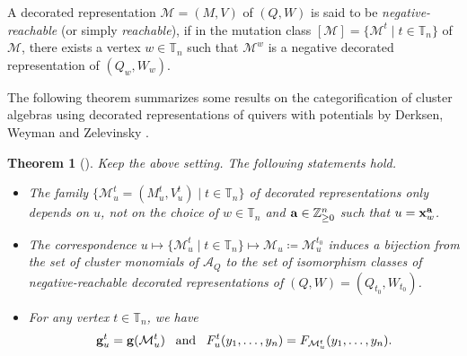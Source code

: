 \documentclass[12pt]{amsart}
\newtheorem{theorem}{Theorem}[section]
\theoremstyle{definition}
\theoremstyle{remark}
\numberwithin{equation}{section}
\begin{document}
A decorated representation $\mathcal M=(M,V)$ of $(Q,W)$ is said to be {\em negative-reachable} (or simply {\em reachable}), if in the mutation class $[\mathcal M]=\{\mathcal M^t\mid t\in \mathbb T_n\}$ of $\mathcal M$, there exists a vertex $w\in \mathbb T_n$ such that $\mathcal M^w$ is a negative decorated representation of $(Q_w, W_w)$. 

The following theorem summarizes some results on the categorification of cluster algebras using decorated representations of quivers with potentials
by Derksen, Weyman and Zelevinsky \cite{DWZ10}.

\begin{theorem}[{\cite{DWZ10}}]
\label{thm:DWZ-g-F}
Keep the above setting. The following statements hold.
\begin{itemize}
    \item [(i)]\label{eq:DWZ-g-F1} The family $\{\mathcal M_u^t=(M_u^t,V_u^t)\mid t\in\mathbb T_n\}$  of decorated representations only depends on $u$, not on the choice of $w\in\mathbb T_n$ and ${\bf a}\in\mathbb Z_{\geq 0}^n$ such that $u={\bf x}_w^{\bf a}$.
    \item [(ii)]\label{eq:DWZ-g-F2} The correspondence $u\mapsto \{\mathcal M_u^t\mid t\in\mathbb T_n\}\mapsto \mathcal M_u\coloneqq \mathcal M_u^{t_0}$ induces a bijection from  the set of cluster monomials of $\mathcal A_Q$ to the set of isomorphism classes of negative-reachable decorated representations of $(Q,W)=(Q_{t_0},W_{t_0})$. 
    \item[(iii)]\label{eq:DWZ-g-F3} For any vertex $t\in\mathbb T_n$, we have 
    \[{\bf g}_u^t={\bf g}(\mathcal M_u^t)\;\;\;\text{and}\;\;\;F_u^t(y_1,\ldots,y_n)=F_{\mathcal M_u^t}(y_1,\ldots,y_n).
    \]
\end{itemize}
\end{theorem}
\end{document}
